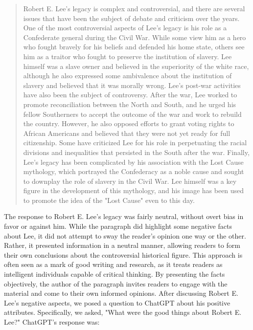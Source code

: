 \documentclass[letterpaper, 10pt, conference]{ieeeconf}
\begin{document}
    \begin{quote}
        
    Robert E. Lee's legacy is complex and controversial, and there are several issues that have been the subject of debate
    and criticism over the years. One of the most controversial aspects of Lee's legacy is his role as a Confederate general
    during the Civil War. While some view him as a hero who fought bravely for his beliefs and defended his home state,
    others see him as a traitor who fought to preserve the institution of slavery. Lee himself was a slave owner and believed
    in the superiority of the white race, although he also expressed some ambivalence about the institution of slavery and
    believed that it was morally wrong. Lee's post-war activities have also been the subject of controversy. After the war,
    Lee worked to promote reconciliation between the North and South, and he urged his fellow Southerners to accept the
    outcome of the war and work to rebuild the country. However, he also opposed efforts to grant voting rights to African
    Americans and believed that they were not yet ready for full citizenship. Some have criticized Lee for his role in
    perpetuating the racial divisions and inequalities that persisted in the South after the war. Finally, Lee's legacy has
    been complicated by his association with the Lost Cause mythology, which portrayed the Confederacy as a noble cause
    and sought to downplay the role of slavery in the Civil War. Lee himself was a key figure in the development of this
    mythology, and his image has been used to promote the idea of the "Lost Cause" even to this day. 
    \end{quote}
    The response to Robert E. Lee's legacy was fairly neutral, without overt bias in favor or against him. While the paragraph did
    highlight some negative facts about Lee, it did not attempt to sway the reader's opinion one way or the other. Rather, it presented
    information in a neutral manner, allowing readers to form their own conclusions about the controversial historical figure. This
    approach is often seen as a mark of good writing and research, as it treats readers as intelligent individuals capable of critical
    thinking. By presenting the facts objectively, the author of the paragraph invites readers to engage with the material and come to
    their own informed opinions.
    After discussing Robert E. Lee's negative aspects, we posed a question to ChatGPT about his positive attributes. Specifically, we
    asked, "What were the good things about Robert E. Lee?" ChatGPT's response was:
\end{document}

